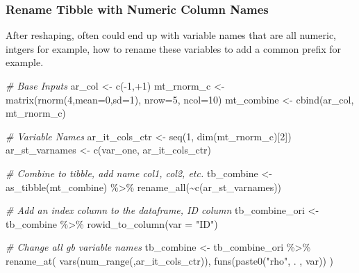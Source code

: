 \documentclass[
]{book}
\newenvironment{Shaded}{\begin{snugshade}}{\end{snugshade}}
\newcommand{\AttributeTok}[1]{\textcolor[rgb]{0.77,0.63,0.00}{#1}}
\newcommand{\CommentTok}[1]{\textcolor[rgb]{0.56,0.35,0.01}{\textit{#1}}}
\newcommand{\DecValTok}[1]{\textcolor[rgb]{0.00,0.00,0.81}{#1}}
\newcommand{\FunctionTok}[1]{\textcolor[rgb]{0.00,0.00,0.00}{#1}}
\newcommand{\NormalTok}[1]{#1}
\newcommand{\OtherTok}[1]{\textcolor[rgb]{0.56,0.35,0.01}{#1}}
\newcommand{\SpecialCharTok}[1]{\textcolor[rgb]{0.00,0.00,0.00}{#1}}
\newcommand{\StringTok}[1]{\textcolor[rgb]{0.31,0.60,0.02}{#1}}
\begin{document}
\hypertarget{rename-tibble-with-numeric-column-names}{%
\subsubsection{Rename Tibble with Numeric Column Names}\label{rename-tibble-with-numeric-column-names}}

After reshaping, often could end up with variable names that are all numeric, intgers for example, how to rename these variables to add a common prefix for example.

\begin{Shaded}
\begin{Highlighting}[]
\CommentTok{\# Base Inputs}
\NormalTok{ar\_col }\OtherTok{\textless{}{-}} \FunctionTok{c}\NormalTok{(}\SpecialCharTok{{-}}\DecValTok{1}\NormalTok{,}\SpecialCharTok{+}\DecValTok{1}\NormalTok{)}
\NormalTok{mt\_rnorm\_c }\OtherTok{\textless{}{-}} \FunctionTok{matrix}\NormalTok{(}\FunctionTok{rnorm}\NormalTok{(}\DecValTok{4}\NormalTok{,}\AttributeTok{mean=}\DecValTok{0}\NormalTok{,}\AttributeTok{sd=}\DecValTok{1}\NormalTok{), }\AttributeTok{nrow=}\DecValTok{5}\NormalTok{, }\AttributeTok{ncol=}\DecValTok{10}\NormalTok{)}
\NormalTok{mt\_combine }\OtherTok{\textless{}{-}} \FunctionTok{cbind}\NormalTok{(ar\_col, mt\_rnorm\_c)}

\CommentTok{\# Variable Names}
\NormalTok{ar\_it\_cols\_ctr }\OtherTok{\textless{}{-}} \FunctionTok{seq}\NormalTok{(}\DecValTok{1}\NormalTok{, }\FunctionTok{dim}\NormalTok{(mt\_rnorm\_c)[}\DecValTok{2}\NormalTok{])}
\NormalTok{ar\_st\_varnames }\OtherTok{\textless{}{-}} \FunctionTok{c}\NormalTok{(}\StringTok{\textquotesingle{}var\_one\textquotesingle{}}\NormalTok{, ar\_it\_cols\_ctr)}

\CommentTok{\# Combine to tibble, add name col1, col2, etc.}
\NormalTok{tb\_combine }\OtherTok{\textless{}{-}} \FunctionTok{as\_tibble}\NormalTok{(mt\_combine) }\SpecialCharTok{\%\textgreater{}\%} \FunctionTok{rename\_all}\NormalTok{(}\SpecialCharTok{\textasciitilde{}}\FunctionTok{c}\NormalTok{(ar\_st\_varnames))}

\CommentTok{\# Add an index column to the dataframe, ID column}
\NormalTok{tb\_combine\_ori }\OtherTok{\textless{}{-}}\NormalTok{ tb\_combine }\SpecialCharTok{\%\textgreater{}\%} \FunctionTok{rowid\_to\_column}\NormalTok{(}\AttributeTok{var =} \StringTok{"ID"}\NormalTok{)}

\CommentTok{\# Change all gb variable names}
\NormalTok{tb\_combine }\OtherTok{\textless{}{-}}\NormalTok{ tb\_combine\_ori }\SpecialCharTok{\%\textgreater{}\%}
                  \FunctionTok{rename\_at}\NormalTok{(}
                    \FunctionTok{vars}\NormalTok{(}\FunctionTok{num\_range}\NormalTok{(}\StringTok{\textquotesingle{}\textquotesingle{}}\NormalTok{,ar\_it\_cols\_ctr)),}
                    \FunctionTok{funs}\NormalTok{(}\FunctionTok{paste0}\NormalTok{(}\StringTok{"rho"}\NormalTok{, . , }\StringTok{\textquotesingle{}var\textquotesingle{}}\NormalTok{))}
\NormalTok{                    )}


\end{Highlighting}
\end{Shaded}
\end{document}
